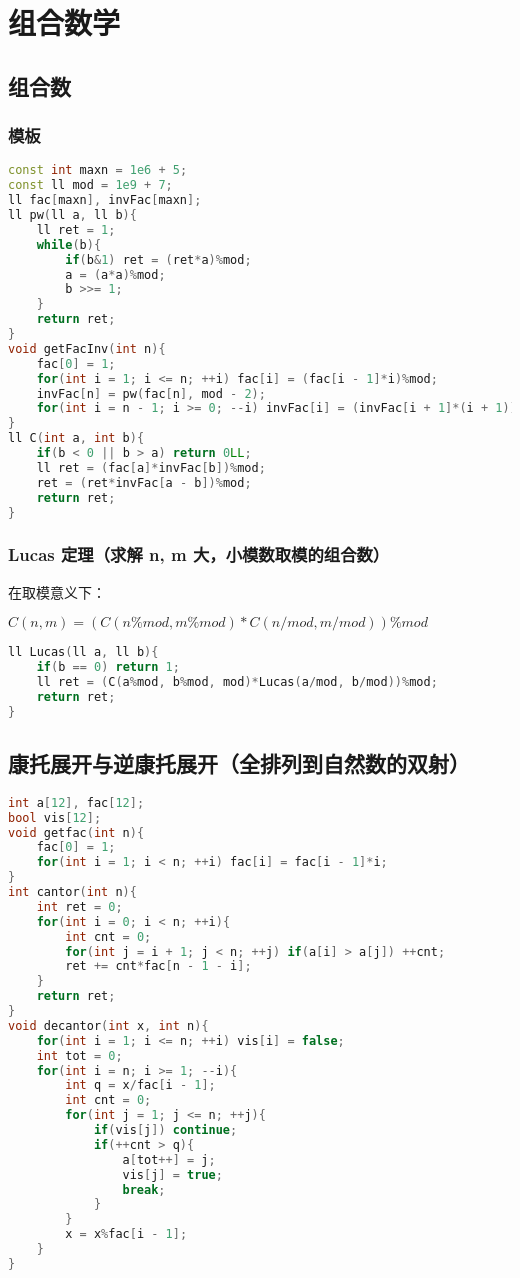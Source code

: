 

\section{组合数学}

\subsection{组合数}

\subsubsection{模板}

\begin{lstlisting}[language=C++]
const int maxn = 1e6 + 5;
const ll mod = 1e9 + 7;
ll fac[maxn], invFac[maxn];
ll pw(ll a, ll b){
    ll ret = 1;
    while(b){
        if(b&1) ret = (ret*a)%mod;
        a = (a*a)%mod;
        b >>= 1;
    }
    return ret;
}
void getFacInv(int n){
    fac[0] = 1;
    for(int i = 1; i <= n; ++i) fac[i] = (fac[i - 1]*i)%mod;
    invFac[n] = pw(fac[n], mod - 2);
    for(int i = n - 1; i >= 0; --i) invFac[i] = (invFac[i + 1]*(i + 1))%mod;
}
ll C(int a, int b){
    if(b < 0 || b > a) return 0LL;
    ll ret = (fac[a]*invFac[b])%mod;
    ret = (ret*invFac[a - b])%mod;
    return ret;
}
\end{lstlisting}

\subsubsection{Lucas 定理（求解 n, m 大，小模数取模的组合数）}

在取模意义下：

$C(n,m) = (C(n\%mod,m\%mod)*C(n/mod,m/mod))\%mod$

\begin{lstlisting}[language=C++]
ll Lucas(ll a, ll b){
    if(b == 0) return 1;
    ll ret = (C(a%mod, b%mod, mod)*Lucas(a/mod, b/mod))%mod;
    return ret;
}
\end{lstlisting}

\subsection{康托展开与逆康托展开（全排列到自然数的双射）}

\begin{lstlisting}[language=C++]
int a[12], fac[12];
bool vis[12];
void getfac(int n){
    fac[0] = 1;
    for(int i = 1; i < n; ++i) fac[i] = fac[i - 1]*i;
}
int cantor(int n){
    int ret = 0;
    for(int i = 0; i < n; ++i){
        int cnt = 0;
        for(int j = i + 1; j < n; ++j) if(a[i] > a[j]) ++cnt;
        ret += cnt*fac[n - 1 - i];
    }
    return ret;
}
void decantor(int x, int n){
    for(int i = 1; i <= n; ++i) vis[i] = false;
    int tot = 0;
    for(int i = n; i >= 1; --i){
        int q = x/fac[i - 1];
        int cnt = 0;
        for(int j = 1; j <= n; ++j){
            if(vis[j]) continue;
            if(++cnt > q){
                a[tot++] = j;
                vis[j] = true;
                break;
            }
        }
        x = x%fac[i - 1];
    }
}
\end{lstlisting}

